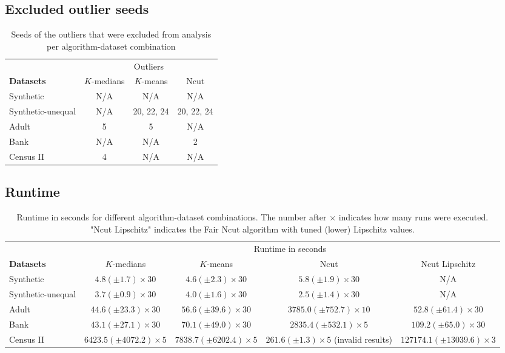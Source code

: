 \subsection*{Excluded outlier seeds}

\begin{table}[H]
    \centering
    \begin{tabular}{|l|c|c|c|}
        \hline
            & \multicolumn{3}{c|}{Outliers} \\
            \cline{2-4}
        \textbf{Datasets} & $K$-medians & $K$-means & Ncut \\ 
	\cline{2-4}
        \hline
        Synthetic & N/A & N/A & N/A \\
	Synthetic-unequal & N/A & 20, 22, 24 & 20, 22, 24 \\
	Adult & 5 & 5 & N/A \\
	Bank & N/A & N/A & 2 \\
	Census II & 4 & N/A & N/A \\
        \hline
    \end{tabular}
    \caption{Seeds of the outliers that were excluded from analysis per algorithm-dataset combination}
    \label{tab:outliers}
\end{table}

\subsection*{Runtime}

\begin{table}[H]
\small 
    \centering
    \begin{tabular}{|l|c|c|c|c|}
        \hline
            & \multicolumn{4}{c|}{Runtime in seconds} \\
            \cline{2-5}
        \textbf{Datasets} & $K$-medians & $K$-means & Ncut & Ncut Lipschitz \\ 
	\cline{2-5}
        \hline
        Synthetic & $4.8 (\pm1.7) \times 30$ & $4.6 (\pm2.3) \times 30$ & $5.8 (\pm1.9) \times 30$ & N/A \\
	Synthetic-unequal & $3.7 (\pm0.9) \times 30$ & $4.0 (\pm1.6) \times 30$ & $2.5 (\pm1.4) \times 30$ & N/A \\
	Adult & $44.6 (\pm23.3) \times 30$ & $56.6 (\pm39.6) \times 30$ & $3785.0 (\pm752.7) \times 10$ & $52.8 (\pm61.4) \times 30$ \\
	Bank & $43.1 (\pm27.1) \times 30$ & $70.1 (\pm49.0) \times 30$ & $2835.4 (\pm532.1) \times 5$ & $109.2 (\pm65.0) \times 30$ \\
	Census II & $6423.5 (\pm4072.2) \times 5$ & $7838.7 (\pm6202.4) \times 5$ & $261.6 (\pm1.3) \times 5$ (invalid results) & $127174.1 (\pm13039.6) \times 3$ \\
        \hline
    \end{tabular}
    \caption{Runtime in seconds for different algorithm-dataset combinations. The number after $\times$ indicates how many runs were executed. "Ncut Lipschitz" indicates the Fair Ncut algorithm with tuned (lower) Lipschitz values.}
    \label{tab:runtime}
\end{table}


